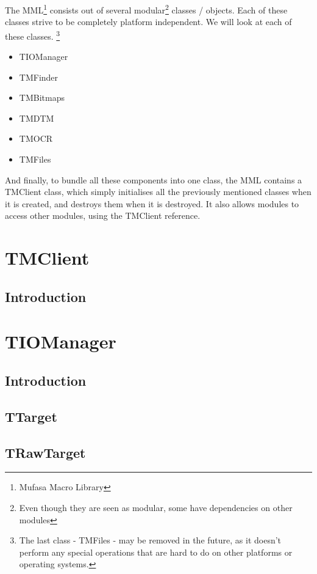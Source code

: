\documentclass[a4paper, 10pt]{report} %
\begin{document}
The MML\footnote{Mufasa Macro Library} consists out of several
modular\footnote{Even though they are seen as modular, some have dependencies on
other modules} classes / objects. Each of these classes strive to be
completely platform independent. We will look at each of these classes.
\footnote{
The last class - TMFiles - may be removed in the future, as it doesn't
perform any special operations that are hard to do on other platforms or
operating systems.
}

\begin{itemize}
    \item   TIOManager
    \item   TMFinder
    \item   TMBitmaps
    \item   TMDTM
    \item   TMOCR
    \item   TMFiles
\end{itemize}

And finally, to bundle all these components into one class, the MML contains a
TMClient class, which simply initialises all the previously mentioned classes
when it is created, and destroys them when it is destroyed. It also allows
modules to access other modules, using the TMClient reference.

\section{TMClient}

\subsection{Introduction}


\section{TIOManager}


\subsection{Introduction}

\subsection{TTarget}
\subsection{TRawTarget}
\end{document}
